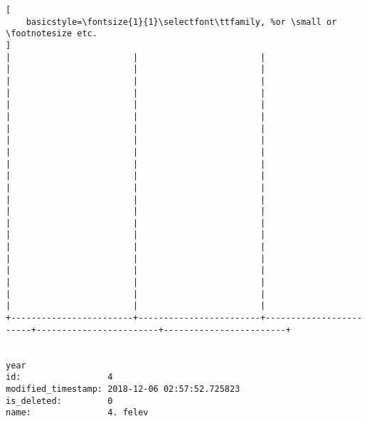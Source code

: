 \begin{lstlisting}[
    basicstyle=\fontsize{1}{1}\selectfont\ttfamily, %or \small or \footnotesize etc.
]
|                        |                        |                        |                        |                        | 
|                        |                        |                        |                        |                        | 
|                        |                        |                        |                        |                        | 
|                        |                        |                        |                        |                        | 
|                        |                        |                        |                        |                        | 
|                        |                        |                        |                        |                        | 
|                        |                        |                        |                        |                        | 
|                        |                        |                        |                        |                        | 
|                        |                        |                        |                        |                        | 
|                        |                        |                        |                        |                        | 
|                        |                        |                        |                        |                        | 
+------------------------+------------------------+------------------------+------------------------+------------------------+


year                
id:                 4
modified_timestamp: 2018-12-06 02:57:52.725823
is_deleted:         0
name:               4. felev


\end{lstlisting}
